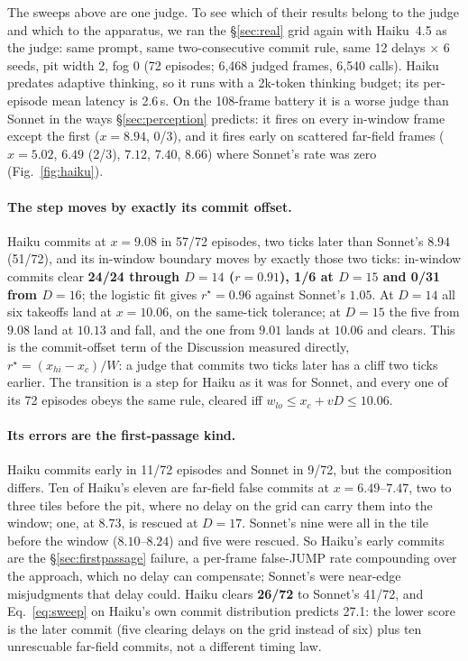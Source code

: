 \documentclass[11pt]{article}
\newcommand{\rstar}{r^{\star}}
\begin{document}
The sweeps above are one judge. To see which of their results belong to the
judge and which to the apparatus, we ran the \S\ref{sec:real} grid again
with Haiku~4.5 as the judge: same prompt, same two-consecutive commit rule,
same 12 delays $\times$ 6 seeds, pit width 2, fog 0 (72 episodes; 6{,}468
judged frames, 6{,}540 calls). Haiku predates adaptive thinking, so it runs with a 2k-token
thinking budget; its per-episode mean latency is 2.6\,s. On the 108-frame
battery it is a worse judge than Sonnet in the ways \S\ref{sec:perception}
predicts: it fires on every in-window frame except the first ($x = 8.94$,
0/3), and it fires early on scattered far-field frames ($x = 5.02$, $6.49$
(2/3), $7.12$, $7.40$, $8.66$) where Sonnet's rate was zero
(Fig.~\ref{fig:haiku}).

\paragraph{The step moves by exactly its commit offset.} Haiku commits at
$x = 9.08$ in 57/72 episodes, two ticks later than Sonnet's $8.94$ (51/72),
and its in-window boundary moves by exactly those two ticks: in-window
commits clear \textbf{24/24 through $D = 14$ ($r = 0.91$), 1/6 at $D = 15$
and 0/31 from $D = 16$}; the logistic fit gives $\rstar = 0.96$ against
Sonnet's $1.05$. At $D = 14$ all six takeoffs land at $x = 10.06$, on the
same-tick tolerance; at $D = 15$ the five from $9.08$ land at $10.13$ and
fall, and the one from $9.01$ lands at $10.06$ and clears. This is the
commit-offset term of the Discussion measured directly, $\rstar = (x_{hi} -
x_c)/W$: a judge that commits two ticks later has a cliff two ticks
earlier. The transition is a step for Haiku as it was for Sonnet, and every
one of its 72 episodes obeys the same rule, cleared iff
$w_{lo} \le x_c + vD \le 10.06$.

\paragraph{Its errors are the first-passage kind.} Haiku commits early in
11/72 episodes and Sonnet in 9/72, but the composition differs. Ten of
Haiku's eleven are far-field false commits at $x = 6.49$--$7.47$, two to
three tiles before the pit, where no delay on the grid can carry them into
the window; one, at $8.73$, is rescued at $D = 17$. Sonnet's nine were all
in the tile before the window ($8.10$--$8.24$) and five were rescued. So
Haiku's early commits are the \S\ref{sec:firstpassage} failure, a per-frame
false-JUMP rate compounding over the approach, which no delay can
compensate; Sonnet's were near-edge misjudgments that delay could. Haiku
clears \textbf{26/72} to Sonnet's 41/72, and Eq.~\ref{eq:sweep} on Haiku's
own commit distribution predicts 27.1: the lower score is the later commit
(five clearing delays on the grid instead of six) plus ten unrescuable
far-field commits, not a different timing law.
\end{document}

